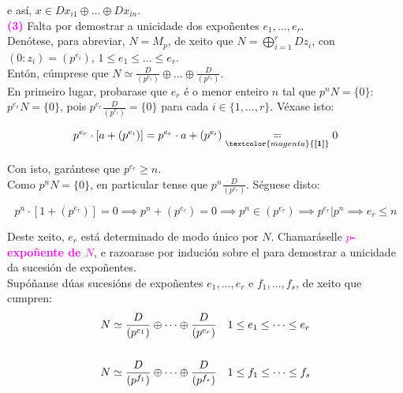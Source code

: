 \documentclass[twoside]{report}
\newcommand{\magbf}[1]{\textcolor{magenta}{\textbf{#1}}} %
\theoremstyle{mystyle}
\begin{document}
\vspace{2mm}

\noindent e así, $x \in Dx_{i1} \oplus \dots \oplus Dx_{in}$. \\

\noindent \magbf{(3)} Falta por demostrar a unicidade dos expoñentes $e_{1}, \dots, e_{r}$.\\

\noindent Denótese, para abreviar, $N = M_{p}$, de xeito que $N = \displaystyle \bigoplus_{i = 1}^{r}Dz_{i}$,  con $(0 : z_{i}) = (p^{e_{i}})$, $1 \leq e_{1} \leq \dots \leq e_{r}$.\\

\noindent Entón, cúmprese que $N \simeq \displaystyle \frac{D}{(p^{e_{1}})} \oplus \dots \oplus \frac{D}{(p^{e_{r}})}$.\\

\noindent En primeiro lugar, probarase que $e_{r}$ é o menor enteiro $n$ tal que $p^{n}N = \{0\}$:\\

\noindent {} $p^{e_{r}}N = \{0\}$, pois $p^{e_{r}}\displaystyle \frac{D}{(p^{e_{i}})} = \{0\}$ para cada $i \in \{1, \dots, r\}$. Véxase isto:

$$p^{e_{r}} \cdot [a + (p^{e_{i}})] = p^{e_{r}} \cdot a + (p^{e_{i}}) \underset{\magbf{[1]}}{=} 0$$

\vspace{2mm}

\noindent Con isto, garántese que $p^{e_{r}} \geq n$. \\

\noindent {} Como $p^{n}N = \{0\}$, en particular tense que $p^{n} \displaystyle \frac{D}{(p^{e_{r}})}$. Séguese disto:

$$p^{n} \cdot [1 + (p^{e_{r}})] = 0 \implies p^{n} + (p^{e_{r}}) = 0 \implies p^{n} \in (p^{e_{r}}) \implies p^{e_{r}} | p^{n} \implies e_{r} \leq n$$

\vspace{2mm}

\noindent Deste xeito, $e_{r}$ está determinado de modo único por $N$. Chamaráselle \magbf{$p$-expoñente de $N$}, e razoarase por indución sobre el para demostrar a unicidade da sucesión de expoñentes.\\

\noindent Supóñanse dúas sucesións de expoñentes $e_{1}, \dots, e_{r}$ e $f_{1}, \dots, f_{s}$, de xeito que cumpren:
\begin{align*}
    N & \simeq \displaystyle \frac{D}{(p^{e_{1}})} \oplus \dots \oplus \frac{D}{(p^{e_{r}})} & & 1 \leq e_{1} \leq \dots \leq e_{r} \\
    \vspace{3mm}\\
    N & \simeq \displaystyle \frac{D}{(p^{f_{1}})} \oplus \dots \oplus \frac{D}{(p^{f_{s}})} & & 1 \leq f_{1} \leq \dots \leq f_{s}
\end{align*}
\end{document}
